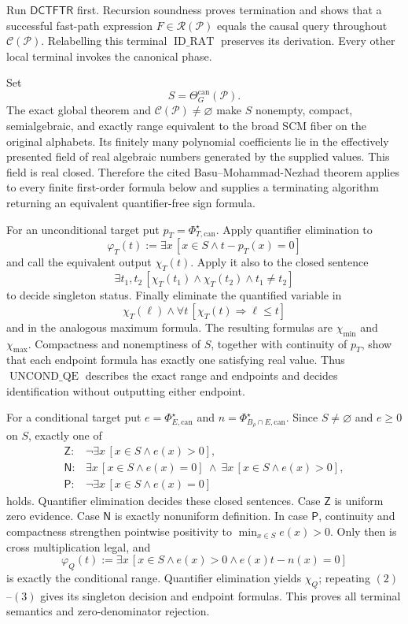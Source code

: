 Run \(\mathsf{DCTFTR}\) first.  Recursion soundness proves termination and shows that a successful fast-path expression \(F\in\mathscr R(\mathcal P)\) equals the causal query throughout \(\mathcal C(\mathcal P)\).  Relabelling this terminal \(\operatorname{ID\_RAT}\) preserves its derivation.  Every other local terminal invokes the canonical phase.

Set
\[
S=\Theta_G^{\mathrm{can}}(\mathcal P).
\]
The exact global theorem and \(\mathcal C(\mathcal P)\ne\varnothing\) make \(S\) nonempty, compact, semialgebraic, and exactly range equivalent to the broad SCM fiber on the original alphabets.  Its finitely many polynomial coefficients lie in the effectively presented field of real algebraic numbers generated by the supplied values.  This field is real closed.  Therefore the cited Basu--Mohammad-Nezhad theorem applies to every finite first-order formula below and supplies a terminating algorithm returning an equivalent quantifier-free sign formula.

For an unconditional target put \(p_T=\Phi_{T,\mathrm{can}}^\star\).  Apply quantifier elimination to
\[
\varphi_T(t):=\exists x\,[x\in S\wedge t-p_T(x)=0]
\tag{1}
\]
and call the equivalent output \(\chi_T(t)\).  Apply it also to the closed sentence
\[
\exists t_1,t_2\,[\chi_T(t_1)\wedge\chi_T(t_2)
\wedge t_1\ne t_2]
\tag{2}
\]
to decide singleton status.  Finally eliminate the quantified variable in
\[
\chi_T(\ell)\wedge
\forall t\,[\chi_T(t)\Longrightarrow\ell\leq t]
\tag{3}
\]
and in the analogous maximum formula.  The resulting formulas are \(\chi_{\min}\) and \(\chi_{\max}\).  Compactness and nonemptiness of \(S\), together with continuity of \(p_T\), show that each endpoint formula has exactly one satisfying real value.  Thus \(\operatorname{UNCOND\_QE}\) describes the exact range and endpoints and decides identification without outputting either endpoint.

For a conditional target put \(e=\Phi_{E,\mathrm{can}}^\star\) and \(n=\Phi_{B_\rho\cap E,\mathrm{can}}^\star\).  Since \(S\ne\varnothing\) and \(e\geq0\) on \(S\), exactly one of
\[
\begin{array}{ll}
\mathsf Z:&\neg\exists x\,[x\in S\wedge e(x)>0],\\
\mathsf N:&\exists x\,[x\in S\wedge e(x)=0]
\ \wedge\ \exists x\,[x\in S\wedge e(x)>0],\\
\mathsf P:&\neg\exists x\,[x\in S\wedge e(x)=0]
\end{array}
\tag{4}
\]
holds.  Quantifier elimination decides these closed sentences.  Case \(\mathsf Z\) is uniform zero evidence.  Case \(\mathsf N\) is exactly nonuniform definition.  In case \(\mathsf P\), continuity and compactness strengthen pointwise positivity to \(\min_{x\in S}e(x)>0\).  Only then is cross multiplication legal, and
\[
\varphi_Q(t):=
\exists x\,[x\in S\wedge e(x)>0\wedge e(x)t-n(x)=0]
\tag{5}
\]
is exactly the conditional range.  Quantifier elimination yields \(\chi_Q\); repeating \((2)\)--\((3)\) gives its singleton decision and endpoint formulas.  This proves all terminal semantics and zero-denominator rejection.

